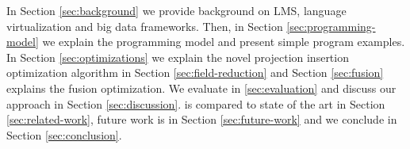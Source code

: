 In Section \ref{sec:background} we provide background on LMS, language virtualization and big data frameworks. Then, in Section \ref{sec:programming-model} we explain the programming model and present simple program examples. In Section \ref{sec:optimizations} we explain the novel projection insertion optimization algorithm in Section \ref{sec:field-reduction} and Section \ref{sec:fusion} explains the fusion optimization. We evaluate \tool in \ref{sec:evaluation} and discuss our approach in Section \ref{sec:discussion}. \tool is compared to state of the art in Section \ref{sec:related-work}, future work is in Section \ref{sec:future-work} and we conclude in Section \ref{sec:conclusion}.
